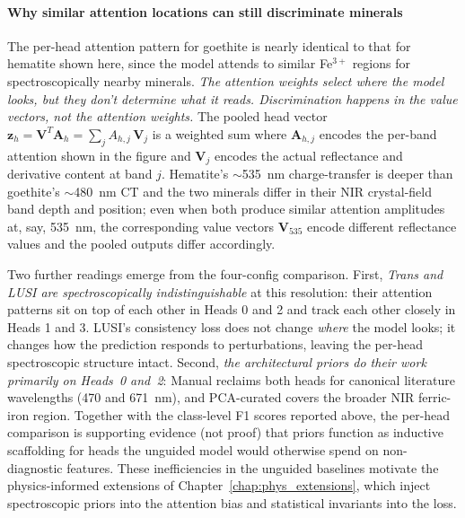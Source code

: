 \documentclass[11pt]{report}
\begin{document}
\paragraph{Why similar attention locations can still discriminate minerals}
The per-head attention pattern for goethite is nearly identical to that for hematite shown here, since the model attends to similar Fe$^{3+}$ regions for spectroscopically nearby minerals. \emph{The attention weights select where the model looks, but they don't determine what it reads. Discrimination happens in the value vectors, not the attention weights.} The pooled head vector $\mathbf{z}_h = \mathbf{V}^T \mathbf{A}_h = \sum_j A_{h,j}\, \mathbf{V}_j$ is a weighted sum where $\mathbf{A}_{h,j}$ encodes the per-band attention shown in the figure and $\mathbf{V}_j$ encodes the actual reflectance and derivative content at band $j$. Hematite's $\sim$535~nm charge-transfer is deeper than goethite's $\sim$480~nm CT and the two minerals differ in their NIR crystal-field band depth and position; even when both produce similar attention amplitudes at, say, 535~nm, the corresponding value vectors $\mathbf{V}_{535}$ encode different reflectance values and the pooled outputs differ accordingly.

Two further readings emerge from the four-config comparison. First, \emph{Trans and LUSI are spectroscopically indistinguishable} at this resolution: their attention patterns sit on top of each other in Heads 0 and 2 and track each other closely in Heads 1 and 3. LUSI's consistency loss does not change \emph{where} the model looks; it changes how the prediction responds to perturbations, leaving the per-head spectroscopic structure intact. Second, \emph{the architectural priors do their work primarily on Heads~0 and~2}: Manual reclaims both heads for canonical literature wavelengths (470 and 671~nm), and PCA-curated covers the broader NIR ferric-iron region. Together with the class-level F1 scores reported above, the per-head comparison is supporting evidence (not proof) that priors function as inductive scaffolding for heads the unguided model would otherwise spend on non-diagnostic features. These inefficiencies in the unguided baselines motivate the physics-informed extensions of Chapter~\ref{chap:phys_extensions}, which inject spectroscopic priors into the attention bias and statistical invariants into the loss.
\end{document}
